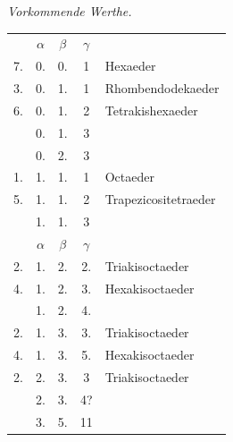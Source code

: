 \begin{center}\emph{Vorkommende Werthe.}\end{center}
\begin{center}
\begin{tabular}{rccc l}
&$\alpha$&$\beta$&$\gamma$&\\
7.&0.&0.&1&Hexaeder\\
3.&0.&1.&1&Rhombendodekaeder\\
6.&0.&1.&2&Tetrakishexaeder\\
&0.&1.&3&\\
&0.&2.&3&\\
1.&1.&1.&1&Octaeder\\
5.&1.&1.&2&Trapezicositetraeder\\
&1.&1.&3&\\[1.2ex]
&$\alpha$&$\beta$&$\gamma$&\\
2.&1.&2.&2.&Triakisoctaeder\\
4.&1.&2.&3.&Hexakisoctaeder\\
&1.&2.&4.&\\
2.&1.&3.&3.&Triakisoctaeder\\
4.&1.&3.&5.&Hexakisoctaeder\\
2.&2.&3.&3&Triakisoctaeder\\
&2.&3.&4?&\\
&3.&5.&11&
\end{tabular}
\end{center}

